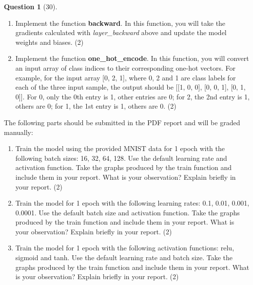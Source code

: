 \documentclass[12pt]{article}
\theoremstyle{definition}
\newtheorem{exercise}{Question}%
\begin{document}
\begin{exercise}[30]
{\begin{enumerate}[label=(\theexercise.\arabic*)]
\begin{enumerate}
        \item Implement the function \textbf{backward}. In this function, you will take the gradients calculated with \textit{layer\_backward} above and update the model weights and biases. (2)
        \item Implement the function \textbf{one\_hot\_encode}. In this function, you will convert an input array of class indices to their corresponding one-hot vectors. For example, for the input array [0, 2, 1], where 0, 2 and 1 are class labels for each of the three input sample, the output should be [[1, 0, 0], [0, 0, 1], [0, 1, 0]]. For 0, only the 0th entry is 1, other entries are 0; for 2, the 2nd entry is 1, others are 0; for 1, the 1st entry is 1, others are 0. (2)
    \end{enumerate}
    The following parts should be submitted in the PDF report and will be graded manually:
    \begin{enumerate}[start=10]
    \item Train the model using the provided MNIST data for 1 epoch with the following batch sizes: 16, 32, 64, 128. Use the default learning rate and activation function. Take the graphs produced by the train function and include them in your report. What is your observation? Explain briefly in your report. (2)
    \item Train the model for 1 epoch with the following learning rates: 0.1, 0.01, 0.001, 0.0001. Use the default batch size and activation function. Take the graphs produced by the train function and include them in your report. What is your observation? Explain briefly in your report. (2)
    \item Train the model for 1 epoch with the following activation functions: relu, sigmoid and tanh. Use the default learning rate and batch size. Take the graphs produced by the train function and include them in your report. What is your observation? Explain briefly in your report. (2)
    \end{enumerate}
\end{enumerate}}

\end{exercise}
\end{document}
